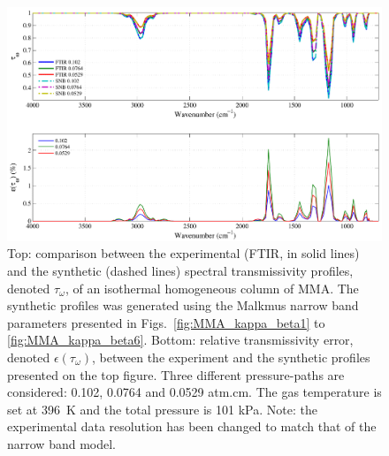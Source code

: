 \begin{figure}[p]
\includegraphics[width=\textwidth]{Figures/Comparison_Fit_MMA_MALKMUS_Temp396K.pdf}
\caption{Top: comparison between the experimental (FTIR, in solid lines) and the synthetic (dashed lines) spectral transmissivity profiles, denoted $\tau_{\omega}$, of an isothermal homogeneous column of MMA. The synthetic profiles was generated using the Malkmus narrow band parameters presented in Figs.~\ref{fig:MMA_kappa_beta1} to \ref{fig:MMA_kappa_beta6}. Bottom: relative transmissivity error, denoted $\epsilon{(\tau_{\omega})}$, between the experiment and the synthetic profiles presented on the top figure. Three different pressure-paths are considered: 0.102, 0.0764 and 0.0529 atm.cm. The gas temperature is set at 396~K and the total pressure is 101 kPa. Note: the experimental data resolution has been changed to match that of the narrow band model. \label{fig:MMA_SNBVerify_396K}}
\end{figure}

